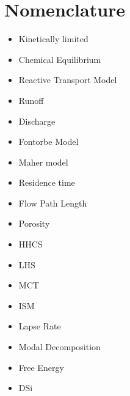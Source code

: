 \documentclass[hidelinks, 12pt]{article} %
\begin{document}
\newpage




\section*{Nomenclature}

\begin{itemize}

  \item Kinetically limited
  \item Chemical Equilibrium
  \item Reactive Transport Model
  \item Runoff
  \item Discharge
  \item Fontorbe Model
  \item Maher model
  \item Residence time
  \item Flow Path Length
  \item Porosity
  \item HHCS
  \item LHS
  \item MCT
  \item ISM
  \item Lapse Rate
  \item Modal Decomposition
  \item Free Energy
  \item DSi

\end{itemize}



\newpage


\FloatBarrier







\newpage




\newpage





\newpage





\newpage





\newpage

\nocite{*}

 
 

\newpage


\end{document}
